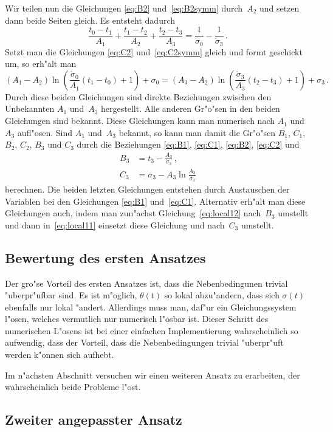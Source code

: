 \documentclass[a4paper]{scrartcl}
\begin{document}
Wir teilen nun die Gleichungen \eqref{eq:B2} und~\eqref{eq:B2symm} durch~$A_2$ und setzen dann beide Seiten gleich. Es entsteht dadurch
$$ \frac{t_0-t_1}{A_1}+\frac{t_1-t_2}{A_2}+\frac{t_2-t_3}{A_3} 
  = \frac{1}{\dot\sigma_0}-\frac{1}{\dot\sigma_3}\,. $$
Setzt man die Gleichungen \eqref{eq:C2} und~\eqref{eq:C2symm} gleich und formt geschickt um, so erh"alt man
$$ (A_1-A_2)\ln\left(\frac{\dot\sigma_0}{A_1}(t_1-t_0)+1\right)+\sigma_0
  = (A_3-A_2)\ln\left(\frac{\dot\sigma_3}{A_3}(t_2-t_3)+1\right)+\sigma_3\,. $$
Durch diese beiden Gleichungen sind direkte Beziehungen zwischen den Unbekannten $A_1$ und~$A_3$ hergestellt. Alle anderen Gr"o"sen in den beiden Gleichungen sind bekannt. Diese Gleichungen kann man numerisch nach $A_1$ und~$A_3$ aufl"osen. Sind $A_1$ und~$A_3$ bekannt, so kann man damit die Gr"o"sen $B_1$, $C_1$, $B_2$, $C_2$, $B_3$ und $C_3$ durch die Beziehungen \eqref{eq:B1}, \eqref{eq:C1}, \eqref{eq:B2}, \eqref{eq:C2} und 
\begin{align*}
  B_3 &= t_3-\frac{A_3}{\dot\sigma_3}\,, \\
  C_3 &= \sigma_3-A_3\ln\frac{A_3}{\dot\sigma_3}
\end{align*}
berechnen. Die beiden letzten Gleichungen entstehen durch Austauschen der Variablen bei den Gleichungen \eqref{eq:B1} und~\eqref{eq:C1}. Alternativ erh"alt man diese Gleichungen auch, indem man zun"achst Gleichung~\eqref{eq:local12} nach~$B_3$ umstellt und dann in~\eqref{eq:local11} einsetzt diese Gleichung und nach~$C_3$ umstellt. 


\subsection{Bewertung des ersten Ansatzes}

Der gro"se Vorteil des ersten Ansatzes ist, dass die Nebenbedingunen trivial "uberpr"ufbar sind. Es ist m"oglich, $\theta(t)$ so lokal abzu"andern, dass sich $\sigma(t)$ ebenfalls nur lokal "andert. Allerdings muss man, daf"ur ein Gleichungssystem l"osen, welches vermutlich nur numerisch l"osbar ist. Dieser Schritt des numerischen L"osens ist bei einer einfachen Implementierung wahrscheinlich so aufwendig, dass der Vorteil, dass die Nebenbedingungen trivial "uberpr"uft werden k"onnen sich aufhebt. 

Im n"achsten Abschnitt versuchen wir einen weiteren Ansatz zu erarbeiten, der wahrscheinlich beide Probleme l"ost.


\subsection{Zweiter angepasster Ansatz} \label{sec:2ndansatz}
\end{document}
